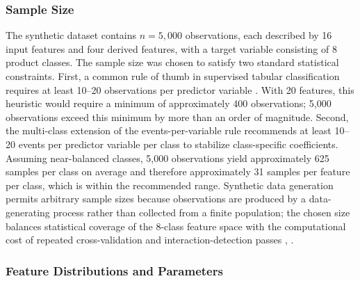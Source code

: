 \documentclass[journal]{./IEEE/IEEEtran}
\begin{document}
\subsubsection{Sample Size}

The synthetic dataset contains $n = 5{,}000$ observations, each described by 16 input features and four derived features, with a target variable consisting of 8 product classes. The sample size was chosen to satisfy two standard statistical constraints. First, a common rule of thumb in supervised tabular classification requires at least 10--20 observations per predictor variable \cite{ref52}. With 20 features, this heuristic would require a minimum of approximately 400 observations; 5{,}000 observations exceed this minimum by more than an order of magnitude. Second, the multi-class extension of the events-per-variable rule \cite{ref53} recommends at least 10--20 events per predictor variable per class to stabilize class-specific coefficients. Assuming near-balanced classes, 5{,}000 observations yield approximately 625 samples per class on average and therefore approximately 31 samples per feature per class, which is within the recommended range. Synthetic data generation permits arbitrary sample sizes because observations are produced by a data-generating process rather than collected from a finite population; the chosen size balances statistical coverage of the 8-class feature space with the computational cost of repeated cross-validation and interaction-detection passes \cite{ref52}, \cite{ref83}.

\subsubsection{Feature Distributions and Parameters}
\end{document}
